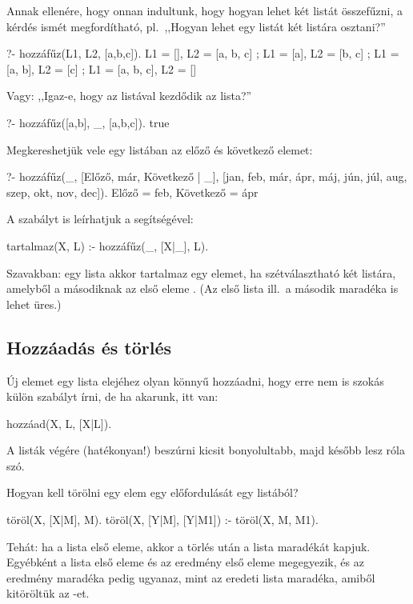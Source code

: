 Annak ellenére, hogy onnan indultunk, hogy hogyan
lehet két listát összefűzni, a kérdés ismét
megfordítható, pl.~,,Hogyan lehet egy listát két
listára osztani?''
\begin{query}
?- hozzáfűz(L1, L2, [a,b,c]).
L1 = [],
L2 = [a, b, c] ;
L1 = [a],
L2 = [b, c] ;
L1 = [a, b],
L2 = [c] ;
L1 = [a, b, c],
L2 = []
\end{query}

Vagy: ,,Igaz-e, hogy az \pr{[a,b]} listával kezdődik
az \pr{[a,b,c]} lista?''
\begin{query}
?- hozzáfűz([a,b], _, [a,b,c]).
true
\end{query}

Megkereshetjük vele egy listában az előző és
következő elemet:
\begin{query}
?- hozzáfűz(_, [Előző, már, Következő | _],
   [jan, feb, már, ápr, máj, jún,
    júl, aug, szep, okt, nov, dec]).
Előző = feb,
Következő = ápr
\end{query}

A  szabályt is leírhatjuk a
segítségével:
\begin{program}
tartalmaz(X, L) :- hozzáfűz(_, [X|_], L).
\end{program}
Szavakban: egy  lista akkor tartalmaz egy
 elemet, ha szétválasztható két listára,
amelyből a másodiknak az első eleme . (Az első
lista ill.~a második maradéka is lehet üres.)

\subsection*{Hozzáadás és törlés}
Új elemet egy lista elejéhez olyan könnyű hozzáadni,
hogy erre nem is szokás külön szabályt írni, de ha
akarunk, itt van:
\begin{program}
hozzáad(X, L, [X|L]).
\end{program}
A listák végére (hatékonyan!) beszúrni kicsit
bonyolultabb, majd később lesz róla szó.

Hogyan kell törölni egy elem egy előfordulását egy
listából?
\begin{program}
töröl(X, [X|M], M).
töröl(X, [Y|M], [Y|M1]) :- töröl(X, M, M1).
\end{program}
Tehát: ha  a lista első eleme, akkor a törlés
után a lista maradékát kapjuk. Egyébként a lista
első eleme és az eredmény első eleme megegyezik, és
az eredmény maradéka pedig ugyanaz, mint az eredeti
lista maradéka, amiből kitöröltük az -et.

